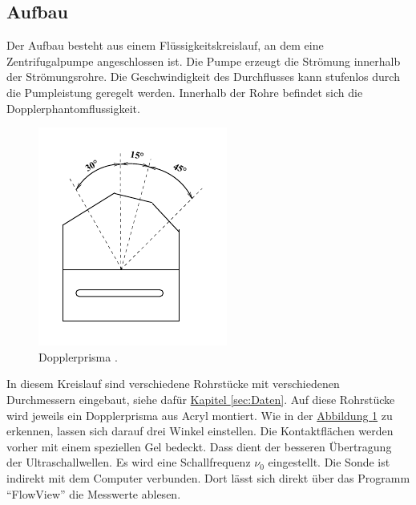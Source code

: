 \subsection{Aufbau}
Der Aufbau besteht aus einem Flüssigkeitskreislauf, an dem eine Zentrifugalpumpe angeschlossen ist.
Die Pumpe erzeugt die Strömung innerhalb der Strömungsrohre. Die Geschwindigkeit des Durchflusses kann stufenlos
durch die Pumpleistung geregelt werden. Innerhalb der Rohre befindet sich die Dopplerphantomflussigkeit.
\begin{figure}
    \center
    \includegraphics[width=\linewidth]{pictures/Skizze2.pdf}
    \caption{Dopplerprisma \cite{us3}.}
    \label{fig:Skizze2}
\end{figure}
In diesem Kreislauf sind verschiedene Rohrstücke mit verschiedenen Durchmessern eingebaut, siehe dafür \hyperref[sec:Daten]{Kapitel \ref{sec:Daten}}.
Auf diese Rohrstücke wird jeweils ein Dopplerprisma aus Acryl montiert.
Wie in der \hyperref[fig:Skizze2]{Abbildung \ref{fig:Skizze2}} zu erkennen, lassen sich darauf drei Winkel einstellen.
Die Kontaktflächen werden vorher mit einem speziellen Gel bedeckt.
Dass dient der besseren Übertragung der Ultraschallwellen.
Es wird eine Schallfrequenz $\nu_0$ eingestellt.
Die Sonde ist indirekt mit dem Computer verbunden. Dort lässt sich direkt über das Programm \enquote{FlowView} die Messwerte ablesen.
